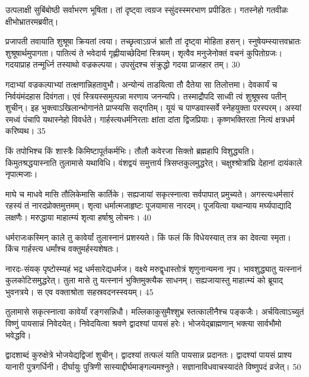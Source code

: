 उत्पलाक्षी सुबिंबोष्ठी सर्वाभरण भूषिता।
तां दृष्ट्वा त्वग्रज स्सुंदस्स्मरभाण प्रपीडितः।
गतस्नेहो गतवीळः क्षीभोभ्रातरमब्रवीत्।

प्रजापती तवायाति शुश्रूषा क्रियतां त्वया।
तच्छृत्वाऽग्रजं भ्रातौ तां दृष्ट्वा मोहिता हसन्।
स्नुषेयम्स्यात्तवभ्रातः शुश्रूषार्थमुपागता।
पातित्यं ते भवेदार्य गृह्णीयाच्छेदिमां स्त्रियम्।
शृत्वैव मनुजेनोक्तं वचनं कुपितोग्रजः।
गदयाप्राह तन्मूर्ध्नि तस्याथो वज्रकल्पया।
उपसुंदश्च संक्रुद्धो गदया प्राजहार तम्।
30

गदाभ्यां वज्रकल्पाभ्यां तत्क्षणान्निहतावुभौ।
अन्योन्यं ताडयित्वा तौ दैतेया सा तिलोत्तमा।
देवकार्यं च निर्वयंमंदहास दिवंगता।
एवं स्त्रियस्समुत्पन्ना मरणाय जनन्यपि।
तस्माद्रौपदि साध्वी त्वं शुश्रूषस्व पतीन् शुचीन्।
इह भुक्त्वाऽखिलान्भोगानंते प्राप्स्यसि सद्गतिम्।
यूयं च पाण्डवास्सर्वे स्नेहयुक्ता परस्परम्।
अस्यां रमध्वं पंचापि यथास्नेहो विवर्धते।
गार्हस्त्यधर्मनिरताः क्षांता दांता द्विजप्रियाः।
कृष्णभक्तिरता नित्यं क्षत्रधर्म करिष्यथ।
35

किं तपोभिश्च किं शास्त्रैः किमिष्टापूर्तकर्मभिः।
तौलौ कवेरजा सिक्तो ब्रह्महापि विशुद्ध्यति।
किमुतश्रद्धयास्नाति तुलामासे यथाविधि।
वंशद्वयं समुत्तार्य त्रिसप्तकुलमुद्धरेत्।
चक्षुश्श्रोत्रांघ्रि देहानां दायंकाले नृपात्मजाः।

माघे च माधवे मासि तौलिकेमासि कार्तिके।
सह्यजायां सकृत्स्नात्वा सर्वपापात् प्रमुच्यते।
अगस्त्यःधर्मसारं रहस्यं तं नारदप्रोक्तमुत्तमम्।
शृत्वा धर्मात्मजाहृष्टः पूजयामास नारदम्।
पूजयित्वा यथान्याय मर्घ्यपाद्यादि लक्षणैः।
मरुद्धाया माहात्म्यं शृत्वा हर्षाश्रु लोचनः।
40

धर्मराजःकस्मिन् काले तु कावेर्यां तुलास्नानं प्रशस्यते।
किं फलं किं विधेयस्यात् तत्र का देवत्या स्मृता।
किंच गार्हस्त्य धर्मांश्च वक्तुमर्हस्यशेषतः।

नारदः-संयक् पृष्टोस्म्यहं भद्र धर्मसारेद्यधर्मज।
वक्ष्ये मरुद्वृधास्तोत्रं शृणुनान्यमना नृप।
भावशुद्ध्यातु यत्स्नानं कुलकोटिसमुद्धरेत्।
तुला मासे तु यत्स्नानं भुक्तिमुक्त्यैक साधनम्।
सह्यजायास्तु माहात्म्यं को ब्रूयाद् भुवनत्रये।
स एव वक्ताश्रोता सहस्रवदनस्स्वयम्।
45

तुलामासे सकृत्स्नात्वा कावेर्यां रङ्गसन्निधौ।
मल्लिकाकुसुमैश्शुभ्र स्तत्कालीनैश्च पङ्कजैः।
अर्चयित्वाऽच्युतं विष्णुं पायसान्नं निवेदयेत्।
निवेदयित्वा श्रवणे द्वादश्यां पायसं हरेः।
भोजयेद्ब्राह्मणान् भक्त्या सार्वभौमो भवेद्धवि।

द्वादशाब्दं कुरुक्षेत्रे भोजयेद्यद्विजां शुचीन्।
द्वादश्यां तत्फलं याति पायसान्न प्रदानतः।
द्वादश्यां पायसं प्राश्य यानारी पुत्रगर्धिनी।
दीर्घायुः पुत्रिणी सास्याद्दीर्घमाङ्गल्यमश्नुते।
सज्ञानाविधवाचस्यादंते विष्णुपदं व्रजेत्।
50

